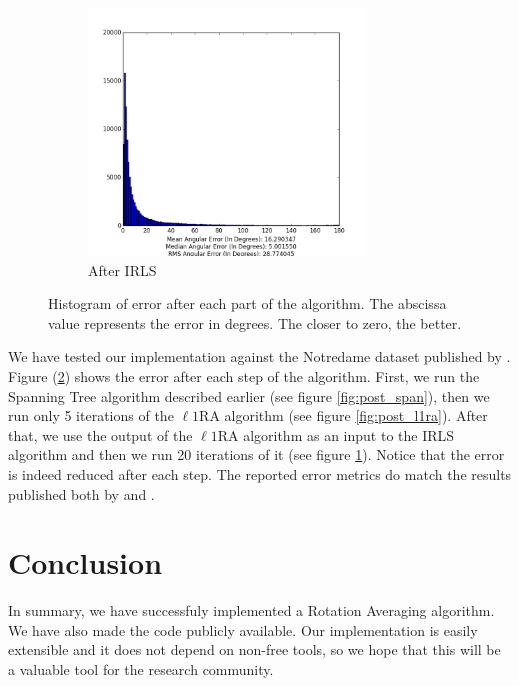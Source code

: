 \documentclass[conference, 12pt]{acmsiggraph}
\begin{document}
\begin{figure}[H]
    \begin{subfigure}{0.5\textwidth}
    \centering
    \includegraphics[width=0.81\textwidth]{images/final_post_irls.png}
    \caption{After IRLS}
    \label{fig:post_irls}
  \end{subfigure}

  \caption{Histogram of error after each part of the algorithm. The abscissa value represents the error in degrees. The closer to zero, the better.}
  \label{fig:results}
\end{figure}

We have tested our implementation against the Notredame dataset published by \cite{translation}. Figure (\ref{fig:results}) shows the error after each step of the algorithm. First, we run the Spanning Tree algorithm described earlier (see figure \ref{fig:post_span}), then we run only 5 iterations of the $\ell1$RA algorithm (see figure \ref{fig:post_l1ra}). After that, we use the output of the $\ell1$RA algorithm as an input to the IRLS algorithm and then we run 20 iterations of it (see figure \ref{fig:post_irls}). Notice that the error is indeed reduced after each step. The reported error metrics do match the results published both by \cite{rotation} and \cite{translation}.

\section{Conclusion}

In summary, we have successfuly implemented a Rotation Averaging algorithm. We have also made the code publicly available. Our implementation is easily extensible and it does not depend on non-free tools, so we hope that this will be a valuable tool for the research community.



\end{document}
